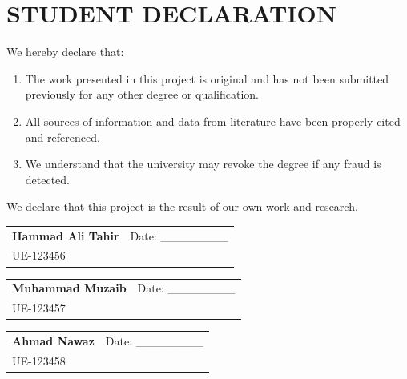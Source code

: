\documentclass[12pt,a4paper]{book}
\numberwithin{table}{chapter}
\numberwithin{figure}{chapter}
\numberwithin{equation}{chapter}
\begin{document}
\clearpage

\chapter*{STUDENT DECLARATION}

\bigskip
We hereby declare that:

\begin{enumerate}
\item The work presented in this project is original and has not been submitted previously for any other degree or qualification.
\item All sources of information and data from literature have been properly cited and referenced.
\item We understand that the university may revoke the degree if any fraud is detected.
\end{enumerate}

\bigskip\bigskip
We declare that this project is the result of our own work and research.

\bigskip\bigskip\bigskip

\begin{tabular}{p{2.5in} p{2.5in}}
 & \\[1\baselineskip]
\hline
\textbf{Hammad Ali Tahir} & Date: \_\_\_\_\_\_\_\_\\[1\baselineskip]
UE-123456 & \\
\end{tabular}

\bigskip

\begin{tabular}{p{2.5in} p{2.5in}}
 & \\[1\baselineskip]
\hline
\textbf{Muhammad Muzaib} & Date: \_\_\_\_\_\_\_\_\\[1\baselineskip]
UE-123457 & \\
\end{tabular}

\bigskip

\begin{tabular}{p{2.5in} p{2.5in}}
 & \\[1\baselineskip]
\hline
\textbf{Ahmad Nawaz} & Date: \_\_\_\_\_\_\_\_\\[1\baselineskip]
UE-123458 & \\
\end{tabular}
\end{document}
